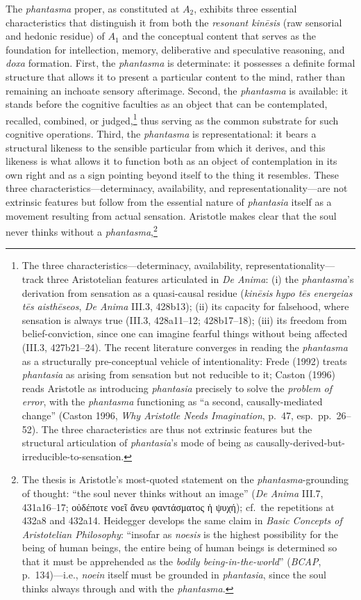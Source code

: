 \documentclass{article}
\newcommand{\gk}[1]{{\greekfont #1}}
\begin{document}
The \textit{phantasma} proper, as constituted at $A_2$, exhibits three essential characteristics that distinguish it from both the \textit{resonant kinēsis} (raw sensorial and hedonic residue) of $A_1$ and the conceptual content that serves as the foundation for intellection, memory, deliberative and speculative reasoning, and \textit{doxa} formation. First, the \textit{phantasma} is determinate: it possesses a definite formal structure that allows it to present a particular content to the mind, rather than remaining an inchoate sensory afterimage. Second, the \textit{phantasma} is available: it stands before the cognitive faculties as an object that can be contemplated, recalled, combined, or judged,\footnote{The three characteristics---determinacy, availability, representationality---track three Aristotelian features articulated in \textit{De Anima}: (i) the \textit{phantasma}'s derivation from sensation as a quasi-causal residue (\textit{kinēsis} \textit{hypo tēs energeias tēs aisthēseos}, \textit{De Anima} III.3, 428b13); (ii) its capacity for falsehood, where sensation is always true (III.3, 428a11--12; 428b17--18); (iii) its freedom from belief-conviction, since one can imagine fearful things without being affected (III.3, 427b21--24). The recent literature converges in reading the \textit{phantasma} as a structurally pre-conceptual vehicle of intentionality: Frede (1992) treats \textit{phantasia} as arising from sensation but not reducible to it; Caston (1996) reads Aristotle as introducing \textit{phantasia} precisely to solve the \textit{problem of error}, with the \textit{phantasma} functioning as ``a second, causally-mediated change'' (Caston 1996, \textit{Why Aristotle Needs Imagination}, p.~47, esp.~pp.~26--52). The three characteristics are thus not extrinsic features but the structural articulation of \textit{phantasia}'s mode of being as causally-derived-but-irreducible-to-sensation.} thus serving as the common substrate for such cognitive operations. Third, the \textit{phantasma} is representational: it bears a structural likeness to the sensible particular from which it derives, and this likeness is what allows it to function both as an object of contemplation in its own right and as a sign pointing beyond itself to the thing it resembles. These three characteristics---determinacy, availability, and representationality---are not extrinsic features but follow from the essential nature of \textit{phantasia} itself as a movement resulting from actual sensation. Aristotle makes clear that the soul never thinks without a \textit{phantasma},\footnote{The thesis is Aristotle's most-quoted statement on the \textit{phantasma}-grounding of thought: ``the soul never thinks without an image'' (\textit{De Anima} III.7, 431a16--17; \gk{οὐδέποτε νοεῖ ἄνευ φαντάσματος ἡ ψυχή}); cf.~the repetitions at 432a8 and 432a14. Heidegger develops the same claim in \textit{Basic Concepts of Aristotelian Philosophy}: ``insofar as \textit{noesis} is the highest possibility for the being of human beings, the entire being of human beings is determined so that it must be apprehended as the \textit{bodily being-in-the-world}'' (\textit{BCAP}, p.~134)---i.e., \textit{noein} itself must be grounded in \textit{phantasia}, since the soul thinks always through and with the \textit{phantasma}.} 
\end{document}
